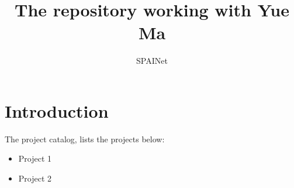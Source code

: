 \documentclass{article}
\title{The repository working with Yue Ma}
\author{SPAINet}
\begin{document}
\maketitle

\section{Introduction}
The project catalog, lists the projects below:
\begin{itemize}
    \item Project 1
    \item Project 2
\end{itemize}
\end{document}
